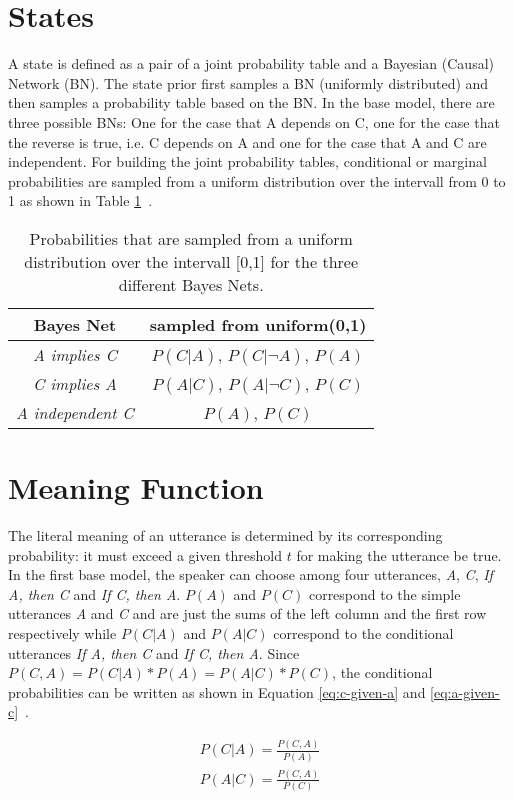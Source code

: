 \section*{States}
A state is defined as a pair of a joint probability table and a Bayesian (Causal) Network (BN). The state prior first samples a BN (uniformly distributed) and then samples a probability table based on the BN. In the base model, there are three possible BNs: One for the case that A depends on C, one for the case that the reverse is true, i.e. C depends on A and one for the case that A and C are independent. For building the joint probability tables, conditional or marginal probabilities are sampled from a uniform distribution over the intervall from 0 to 1 as shown in Table \ref{table:statePrior}~.

\begin{table}[ht]
\center
\begin{tabular}{c|c}
Bayes Net & sampled from uniform(0,1) \\\hline
\textit{A implies C} & $P(C|A)$, $P(C|\neg A)$, $P(A)$ \\
\textit{C implies A} & $P(A|C)$, $P(A|\neg C)$, $P(C)$ \\
\textit{A independent C} &  $P(A)$, $P(C)$
\end{tabular}
\caption{Probabilities that are sampled from a uniform distribution over the intervall [0,1] for the three different Bayes Nets.}
\label{table:statePrior}
\end{table} 

\FloatBarrier
\section*{Meaning Function}

The literal meaning of an utterance is determined by its corresponding probability: it must exceed a given threshold $t$ for making the utterance be true. In the first base model, the speaker can choose among four utterances, \textit{A}, \textit{C}, \textit{If A, then C} and \textit{If C, then A}. $P(A)$ and $P(C)$ correspond to the simple utterances \textit{A} and \textit{C} and are just the sums of the left column and the first row respectively while $P(C|A)$ and $P(A|C)$ correspond to the conditional utterances \textit{If A, then C} and \textit{If C, then A}. Since $P(C,A) = P(C|A) * P(A) = P(A|C) * P(C)$, the conditional probabilities can be written as shown in Equation \ref{eq:c-given-a} and \ref{eq:a-given-c}~. 

\begin{subequations}
\begin{align}
P(C|A) = \frac{P(C,A)}{P(A)} \label{eq:c-given-a} \\
P(A|C) = \frac{P(C,A)}{P(C)} \label{eq:a-given-c}
\end{align}
\end{subequations}

